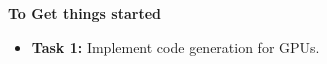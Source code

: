 \textbf{To Get things started}
\begin{itemize}
\item \textbf{Task 1: } Implement code generation for GPUs.
\end{itemize}